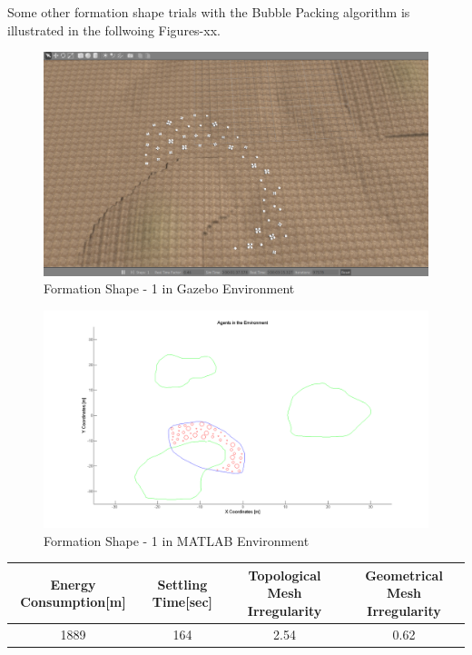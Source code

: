 \documentclass[twoside]{article}
\begin{document}
Some other formation shape trials with the Bubble Packing algorithm is illustrated in the follwoing Figures-xx.


		
		 \begin{figure}[H]
		 	\caption{Formation Shape - 1 in Gazebo Environment}
		 	\centerline{\includegraphics[scale = 0.35]{1_Gazebo}}
		 \end{figure} 
			
			\begin{figure}[H]
		 	\caption{Formation Shape - 1 in MATLAB Environment}
				\centerline{\includegraphics[scale = 0.40]{1}}
			\end{figure} 
			
			\begin{center}
				 \label{tab:title} 
				\begin{tabular}{||c| c |c |c ||}
					
					\hline
				 		\textbf{Energy Consumption[m]}  & \textbf{Settling Time[sec]} & \textbf{Topological Mesh Irregularity} & \textbf{Geometrical Mesh Irregularity}\\ 
					\hline
				 1889 & 164 &  2.54& 0.62\\
					\hline
				\end{tabular}
			\end{center}
		
\end{document}
